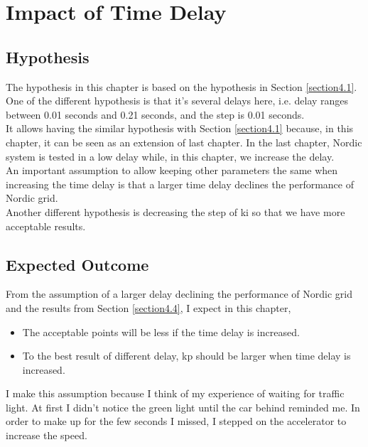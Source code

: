 \documentclass{report}
\begin{document}
\chapter{Impact of Time Delay}
\label{Chapter5}
\section{Hypothesis} %
The hypothesis in this chapter is based on the hypothesis in Section \textcolor{red}{\ref{section4.1}}. \\
 
One of the different hypothesis is that it's several delays here, i.e. delay ranges between 0.01 seconds and 0.21 seconds, and the step is 0.01 seconds. \\

It allows having the similar hypothesis with Section \textcolor{red}{\ref{section4.1}} because, in this chapter, it can be seen as an extension of last chapter. In the last chapter, Nordic system is tested in a low delay while, in this chapter, we increase the delay. \\

An important assumption to allow keeping other parameters the same when increasing the time delay is that a larger time delay declines the performance of Nordic grid. \\

Another different hypothesis is decreasing the step of ki so that we have more acceptable results. \\

\section{Expected Outcome} %
\label{section5.2}
From the assumption of a larger delay declining the performance of Nordic grid and the results from Section \textcolor{red}{\ref{section4.4}}, I expect in this chapter,\\

\begin{itemize}
    \item The acceptable points will be less if the time delay is increased. \\
    \item To the best result of different delay, kp should be larger when time delay is increased. \\
\end{itemize}


I make this assumption because I think of my experience of waiting for traffic light. At first I didn't notice the green light until the car behind reminded me. In order to make up for the few seconds I missed, I stepped on the accelerator to increase the speed.\\ 
\end{document}
